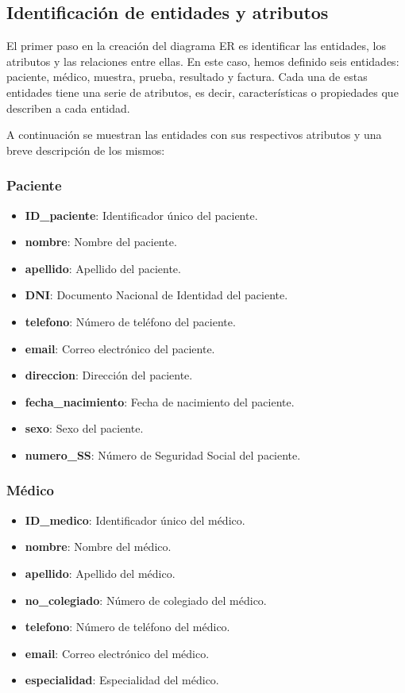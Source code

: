 \documentclass[spanish]{article}
\begin{document}
\subsection{Identificación de entidades y atributos}
El primer paso en la creación del diagrama ER es identificar las entidades, los atributos y las relaciones entre ellas. En este caso, hemos definido seis entidades: paciente, médico, muestra, prueba, resultado y factura. Cada una de estas entidades tiene una serie de atributos, es decir, características o propiedades que describen a cada entidad.

A continuación se muestran las entidades con sus respectivos atributos y una breve descripción de los mismos:

\subsubsection*{Paciente}
\begin{itemize}
    \item \textbf{ID\_paciente}: Identificador único del paciente.
    \item \textbf{nombre}: Nombre del paciente.
    \item \textbf{apellido}: Apellido del paciente.
    \item \textbf{DNI}: Documento Nacional de Identidad del paciente.
    \item \textbf{telefono}: Número de teléfono del paciente.
    \item \textbf{email}: Correo electrónico del paciente.
    \item \textbf{direccion}: Dirección del paciente.
    \item \textbf{fecha\_nacimiento}: Fecha de nacimiento del paciente.
    \item \textbf{sexo}: Sexo del paciente.
    \item \textbf{numero\_SS}: Número de Seguridad Social del paciente.
\end{itemize}

\subsubsection*{Médico}
\begin{itemize}
    \item \textbf{ID\_medico}: Identificador único del médico.
    \item \textbf{nombre}: Nombre del médico.
    \item \textbf{apellido}: Apellido del médico.
    \item \textbf{no\_colegiado}: Número de colegiado del médico.
    \item \textbf{telefono}: Número de teléfono del médico.
    \item \textbf{email}: Correo electrónico del médico.
    \item \textbf{especialidad}: Especialidad del médico.
\end{itemize}
\end{document}

